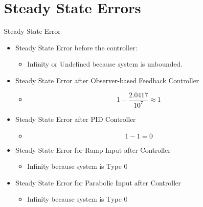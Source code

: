 \documentclass[10pt,compress,mathserif]{beamer}
\begin{document}
\section{Steady State Errors}
\begin{frame}{Steady State Error}
\begin{itemize}
\item Steady State Error before the controller:
\begin{itemize}
\item Infinity or Undefined because system is unbounded. 
\end{itemize}

\item Steady State Error after Observer-based Feedback Controller
\begin{itemize}
\item  \begin{equation}
1 - \frac{2.0417}{10^7}\approx 1
\end{equation}
\end{itemize}

\item Steady State Error after PID Controller
\begin{itemize}
\item \begin{equation}
1 - 1 = 0 
\end{equation}
\end{itemize}
\end{itemize}
\begin{itemize}
\item Steady State Error for Ramp Input after Controller
\begin{itemize}
\item Infinity because system is Type 0
\end{itemize}
\item Steady State Error for Parabolic Input after Controller
\begin{itemize}
\item Infinity because system is Type 0
\end{itemize}
\end{itemize}

\end{frame}
\end{document}
